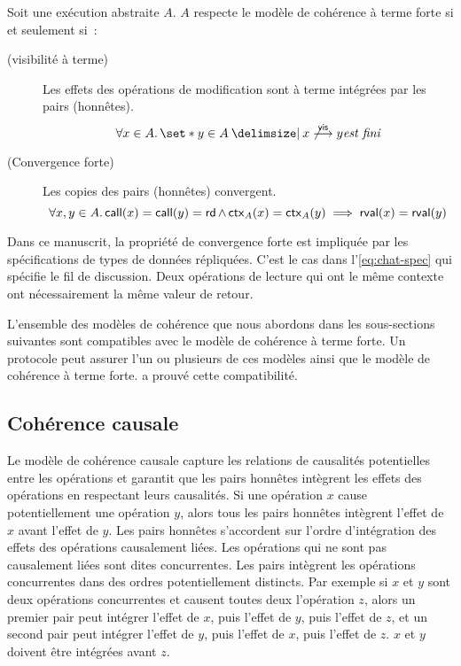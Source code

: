 \begin{definition}\label{def:strong-eventual-consistency}
    Soit une exécution abstraite $A$. $A$ respecte le modèle de cohérence à terme forte si et seulement si~:

    \begin{description}
    \item[ (visibilité à terme)]
    Les effets des opérations de modification sont à terme intégrées par les pairs (honnêtes).
    \begin{equation*}
        \forall x \in A \qsep \set*{y \in A \given x \not\vis y} \textit{est fini}
    \end{equation*}

    \item[ (Convergence forte)]
    Les copies des pairs (honnêtes) convergent.
    \begin{equation*}
        \forall x, y \in A \ldotp \operatorname{\mathsf{call}}(x) = \operatorname{\mathsf{call}}(y) = \operatorname{\mathsf{rd}} \land \operatorname{\mathsf{ctx}}_A(x) = \operatorname{\mathsf{ctx}}_A(y) \implies \operatorname{\mathsf{rval}}(x) = \operatorname{\mathsf{rval}}(y)
    \end{equation*}
    \end{description}
\end{definition}

Dans ce manuscrit, la propriété de convergence forte est impliquée par les spécifications de types de données répliquées.
C'est le cas dans l'\autoref{eq:chat-spec} qui spécifie le fil de discussion.
Deux opérations de lecture qui ont le même contexte ont nécessairement la même valeur de retour.

L'ensemble des modèles de cohérence que nous abordons dans les sous-sections suivantes sont compatibles avec le modèle de cohérence à terme forte.
Un protocole peut assurer l'un ou plusieurs de ces modèles ainsi que le modèle de cohérence à terme forte.
\textcite{mahajan_2011_cac} a prouvé cette compatibilité.


\subsection{Cohérence causale}\label{subsec:caucal-consistency}

Le modèle de cohérence causale capture les relations de causalités potentielles entre les opérations et garantit que les pairs honnêtes intègrent les effets des opérations en respectant leurs causalités.
Si une opération $x$ cause potentiellement une opération $y$, alors tous les pairs honnêtes intègrent l'effet de $x$ avant l'effet de $y$.
Les pairs honnêtes s'accordent sur l'ordre d'intégration des effets des opérations causalement liées.
Les opérations qui ne sont pas causalement liées sont dites concurrentes.
Les pairs intègrent les opérations concurrentes dans des ordres potentiellement distincts.
Par exemple si $x$ et $y$ sont deux opérations concurrentes et causent toutes deux l'opération $z$, alors un premier pair peut intégrer l'effet de $x$, puis l'effet de $y$, puis l'effet de $z$, et un second pair peut intégrer l'effet de $y$, puis l'effet de $x$, puis l'effet de $z$.
$x$ et $y$ doivent être intégrées avant $z$.

